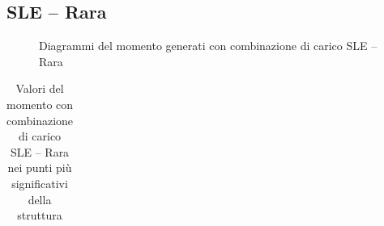 \clearpage	
\begin{landscape}
\subsection*{SLE -- Rara}
\begin{figure}[H]
\centering
{} 
\caption{Diagrammi del momento generati con combinazione di carico SLE -- Rara}
\label{fig:Momenti_SLScharacteristic}
\end{figure}
\begin{table}[H]
\centering
\caption{Valori del momento con combinazione di carico SLE -- Rara nei punti più significativi della struttura}
	\begin{tabular}{lS[table-format=3.2]S[table-format=3.2]S[table-format=3.2]S[table-format=3.2]S[table-format=3.2]S[table-format=3.2]S[table-format=3.2]S[table-format=3.2]S[table-format=3.2]S[table-format=3.2]S[table-format=3.2]S[table-format=3.2]S[table-format=3.2]}

\end{tabular}
\end{table}
\end{landscape}
